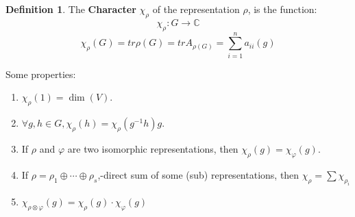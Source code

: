 \documentclass[12pt, a4paper]{article}
\theoremstyle{definition}
\newtheorem{definition}{Definition}[section]
\begin{document}
\begin{center}
\end{center}
\begin{definition}
    The \textbf{Character} $\chi_\rho $ of the representation $\rho$, is the function:
    \[\chi_\rho :G\rightarrow \mathbb{C}\]
    \[\chi_\rho(G) = tr \rho(G) = tr A_{\rho(G)}= \sum_{i=1}^n a_{ii}(g) \]
\end{definition}
\par
Some properties:
\begin{enumerate}
    \item $\chi_\rho (1) = \dim(V)$.
    \item $\forall g,h \in G ,\chi_\rho(h) = \chi_\rho(g^{-1}h)g$.
    \item If $\rho$ and $\varphi$ are two isomorphic representations, then $\chi_\rho(g) = 
        \chi_\varphi(g)$.
    \item If $\rho = \rho_1\oplus \cdots \oplus \rho_s $,-direct sum of some (sub) 
        representations, then $\chi_\rho = \sum \chi_{\rho_i} $
    \item $\chi_{\rho\otimes\varphi}(g) = \chi_\rho(g) \cdot \chi_\varphi(g) $
\end{enumerate}
\end{document}
